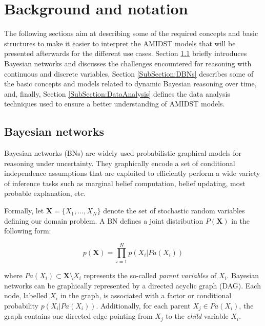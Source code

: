 \section{Background and notation}\label{Section:Preliminaries}

The following sections aim at describing some of the required concepts and basic structures to make it easier to interpret the AMIDST models that will be presented afterwards for the different use cases. Section \ref{SubSection:HybridBNs} briefly introduces Bayesian networks and discusses the challenges encountered for reasoning with continuous and discrete variables, Section \ref{SubSection:DBNs} describes some of the basic concepts and models related to dynamic Bayesian reasoning over time, and, finally, Section \ref{SubSection:DataAnalysis} defines the data analysis techniques used to ensure a better understanding of AMIDST models.

\subsection{Bayesian networks}\label{SubSection:HybridBNs}

Bayesian networks (BNs) \cite{JensenNielsen2007} are widely used probabilistic graphical models for reasoning under uncertainty. They graphically encode a set of conditional independence assumptions that are exploited to efficiently perform a wide variety of inference tasks such as marginal belief computation, belief updating, most probable explanation, etc.  

Formally, let $\bm X = \{X_1,\ldots,X_N\}$ denote the set of stochastic random variables defining our domain problem. A BN defines a joint distribution $P(\bm X)$ in the following form:

$$ p(\bm X) = \prod_{i=1}^N p(X_i|Pa(X_i))$$ 

\noindent where $Pa(X_i)\subset \bm X\setminus X_i$ represents the so-called \emph{parent variables} of $X_i$. Bayesian networks can be graphically represented by a directed acyclic graph (DAG). Each node, labelled $X_i$ in the graph, is associated with a factor or conditional probability $p(X_i|Pa(X_i))$. Additionally, for each parent $X_j \in Pa(X_i)$, the graph contains one directed edge pointing from $X_j$ to the \emph{child} variable $X_i$.

